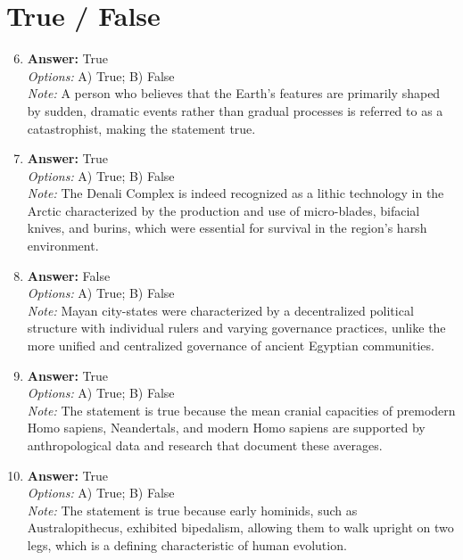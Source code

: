 \documentclass[12pt]{article}
\begin{document}
\section*{True / False}
\begin{enumerate}[label=\arabic*.]
\setcounter{enumi}{5}
\item \textbf{Answer:} True
\\ \textit{Options:} A) True; B) False
\\ \textit{Note:} A person who believes that the Earth's features are primarily shaped by sudden, dramatic events rather than gradual processes is referred to as a catastrophist, making the statement true.
\item \textbf{Answer:} True
\\ \textit{Options:} A) True; B) False
\\ \textit{Note:} The Denali Complex is indeed recognized as a lithic technology in the Arctic characterized by the production and use of micro-blades, bifacial knives, and burins, which were essential for survival in the region's harsh environment.
\item \textbf{Answer:} False
\\ \textit{Options:} A) True; B) False
\\ \textit{Note:} Mayan city-states were characterized by a decentralized political structure with individual rulers and varying governance practices, unlike the more unified and centralized governance of ancient Egyptian communities.
\item \textbf{Answer:} True
\\ \textit{Options:} A) True; B) False
\\ \textit{Note:} The statement is true because the mean cranial capacities of premodern Homo sapiens, Neandertals, and modern Homo sapiens are supported by anthropological data and research that document these averages.
\item \textbf{Answer:} True
\\ \textit{Options:} A) True; B) False
\\ \textit{Note:} The statement is true because early hominids, such as Australopithecus, exhibited bipedalism, allowing them to walk upright on two legs, which is a defining characteristic of human evolution.
\end{enumerate}
\end{document}
